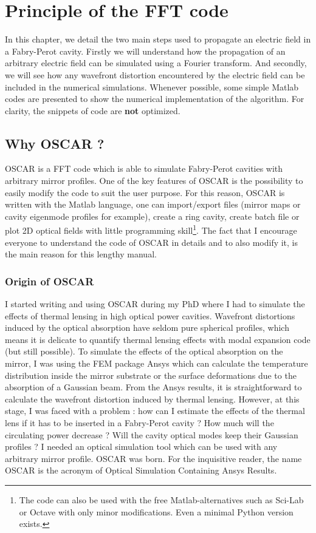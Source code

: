 \chapter{Principle of the FFT code}
\pagestyle{headings}

In this chapter, we detail the two main steps used to propagate an electric field in a Fabry-Perot cavity. Firstly we will understand how the propagation of an arbitrary electric field can be simulated using a Fourier transform. And secondly, we will see how any wavefront distortion encountered by the electric field can be included in the numerical simulations. Whenever possible, some simple Matlab codes are presented to show the numerical implementation of the algorithm. For clarity, the snippets of code are \textbf{not} optimized.

\section{Why OSCAR ?}

OSCAR is a FFT code which is able to simulate Fabry-Perot cavities with arbitrary mirror profiles. One of the key features of OSCAR is the possibility to easily modify the code to suit the user purpose. For this reason, OSCAR is written with the Matlab language, one can import/export files (mirror maps or cavity eigenmode profiles for example), create a ring cavity, create batch file or plot 2D optical fields with little programming skill\footnote{The code can also be used with the free Matlab-alternatives such as Sci-Lab or Octave with only minor modifications. Even a minimal Python version exists.}. The fact that I encourage everyone to understand the code of OSCAR in details and to also modify it, is the main reason for this lengthy manual.

\subsection{Origin of OSCAR}

I started writing and using OSCAR during my PhD where I had to simulate the effects of thermal lensing in high optical power cavities. Wavefront distortions induced by the optical absorption have seldom pure spherical profiles, which means it is delicate to quantify thermal lensing effects with modal expansion code (but still possible).
To simulate the effects of the optical absorption on the mirror, I was using the FEM package Ansys which can calculate the temperature distribution inside the mirror substrate or the surface deformations due to the absorption of a Gaussian beam. From the Ansys results, it is straightforward to calculate the wavefront distortion induced by thermal lensing. However, at this stage, I was faced with a problem : how can I estimate the effects of the thermal lens if it has to be inserted in a Fabry-Perot cavity ? How much will the circulating power decrease ? Will the cavity optical modes keep their Gaussian profiles ? I needed an optical simulation tool which can be used with any arbitrary mirror profile. OSCAR was born. For the inquisitive reader, the name OSCAR is the acronym of Optical Simulation Containing Ansys Results.

